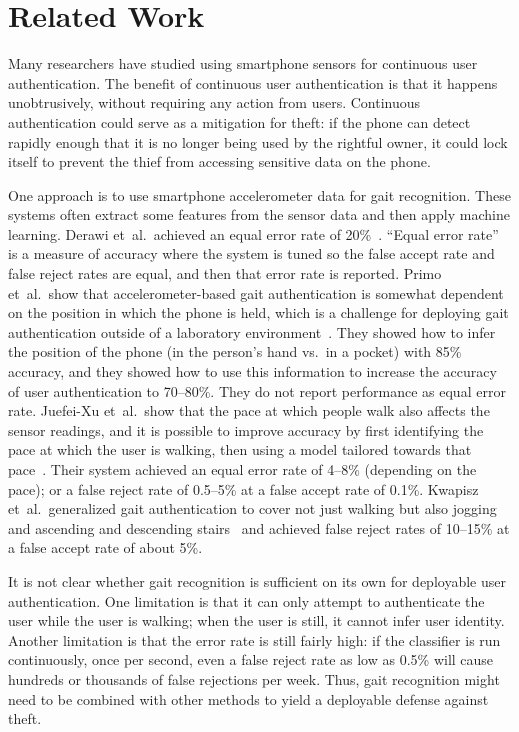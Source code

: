 \section{Related Work}

Many researchers have studied using smartphone sensors for continuous user authentication.
The benefit of continuous user authentication is that it happens unobtrusively, without requiring any action from users.
Continuous authentication could serve as a mitigation for theft: if the phone can detect rapidly enough that it is no longer being used by the rightful owner, it could lock itself to prevent the thief from accessing sensitive data on the phone. 

One approach is to use smartphone accelerometer data for gait recognition.
These systems often extract some features from the sensor data and then apply machine learning.
Derawi et~al.\ achieved an equal error rate of 20\%~\cite{derawi:gait}.
``Equal error rate'' is a measure of accuracy where the system is tuned so the false accept rate and false reject rates are equal, and then that error rate is reported.
Primo et~al.\ show that accelerometer-based gait authentication is somewhat dependent on the position in which the phone is held, which is a challenge for deploying gait authentication outside of a laboratory environment~\cite{primo:context}. 
They showed how to infer the position of the phone (in the person's hand vs.\ in a pocket) with 85\% accuracy, and they showed how to use this information to increase the accuracy of user authentication to 70--80\%.
They do not report performance as equal error rate.
Juefei-Xu et~al.\ show that the pace at which people walk also affects the sensor readings, and it is possible to improve accuracy by first identifying the pace at which the user is walking, then using a model tailored towards that pace~\cite{xu:pace}.
Their system achieved an equal error rate of 4--8\% (depending on the pace); or a false reject rate of 0.5--5\% at a false accept rate of 0.1\%.
Kwapisz et~al.\ generalized gait authentication to cover not just walking but also jogging and ascending and descending stairs~\cite{kwapisz:biometrics} and
achieved false reject rates of 10--15\% at a false accept rate of about 5\%.

It is not clear whether gait recognition is sufficient on its own for deployable user authentication.
One limitation is that it can only attempt to authenticate the user while the user is walking; when the user is still, it cannot infer user identity.
Another limitation is that the error rate is still fairly high: if the classifier is run continuously, once per second, even a false reject rate as low as 0.5\% will cause hundreds or thousands of false rejections per week.
Thus, gait recognition might need to be combined with other methods to yield a deployable defense against theft.

